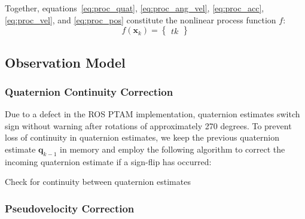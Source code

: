 Together, equations~\ref{eq:proc_quat}, \ref{eq:proc_ang_vel}, \ref{eq:proc_acc}, \ref{eq:proc_vel}, and \ref{eq:proc_pos} constitute the nonlinear process function $f$:
%
\begin{equation}
f\left( \mathbf{x}_{k} \right) = 
\begin{Bmatrix}
    tk
\end{Bmatrix}
\end{equation}

\subsection{Observation Model} \label{Observation_Model}

\subsubsection{Quaternion Continuity Correction}

Due to a defect in the ROS PTAM implementation, quaternion estimates switch sign without warning after rotations of approximately 270 degrees. To prevent loss of continuity in quaternion estimates, we keep the previous quaternion estimate $\mathbf{q}_{k-1}$ in memory and employ the following algorithm to correct the incoming quaternion estimate if a sign-flip has occurred:

\begin{algorithm}
  \caption{Check for continuity between quaternion estimates}
    \label{alg:checkQuatContinuity}
\end{algorithm}

\subsubsection{Pseudovelocity Correction}

